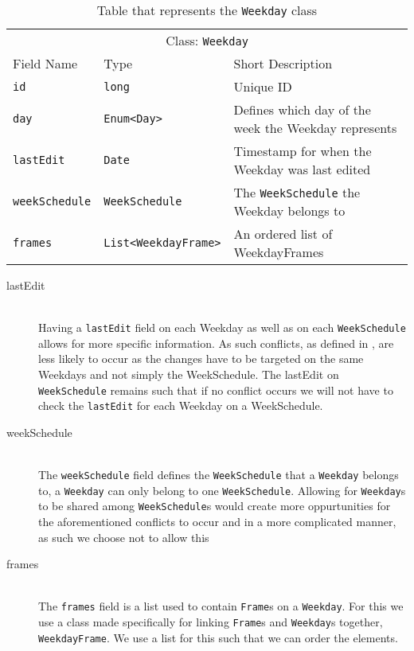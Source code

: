 \begin{table}[]
\centering
\caption{Table that represents the \texttt{Weekday} class}
\label{tbl:Weekday}
\begin{tabular}{lll}
\multicolumn{3}{c}{Class: \texttt{Weekday}}                                                                                    \\
Field Name            & Type                                            & Short Description                                    \\
\texttt{id}           & \texttt{long}                                   & Unique ID                                            \\
\texttt{day}          & \texttt{Enum\textless Day\textgreater}          & Defines which day of the week the Weekday represents \\
\texttt{lastEdit}     & \texttt{Date}                                   & Timestamp for when the Weekday was last edited       \\
\texttt{weekSchedule} & \texttt{WeekSchedule}                           & The \texttt{WeekSchedule} the Weekday belongs to     \\
\texttt{frames}       & \texttt{List\textless WeekdayFrame\textgreater} & An ordered list of WeekdayFrames 
\end{tabular}
\end{table}

\begin{description}
    \item [lastEdit] \hfill \\
    Having a \texttt{lastEdit} field on each Weekday as well as on each \texttt{WeekSchedule} allows for more specific information. 
    As such conflicts, as defined in , are less likely to occur as the changes have to be targeted on the same Weekdays and not simply the WeekSchedule. 
    The lastEdit on \texttt{WeekSchedule} remains such that if no conflict occurs we will not have to check the \texttt{lastEdit} for each Weekday on a WeekSchedule.
    \item [weekSchedule] \hfill \\
    The \texttt{weekSchedule} field defines the \texttt{WeekSchedule} that a \texttt{Weekday} belongs to, a \texttt{Weekday} can only belong to one \texttt{WeekSchedule}.
    Allowing for \texttt{Weekday}s to be shared among \texttt{WeekSchedule}s would create more oppurtunities for the aforementioned conflicts to occur and in a more complicated manner, as such we choose not to allow this
    \item [frames] \hfill \\
    The \texttt{frames} field is a list used to contain \texttt{Frame}s on a \texttt{Weekday}.
    For this we use a class made specifically for linking \texttt{Frame}s and \texttt{Weekday}s together, \texttt{WeekdayFrame}.
    We use a list for this such that we can order the elements.
\end{description}

